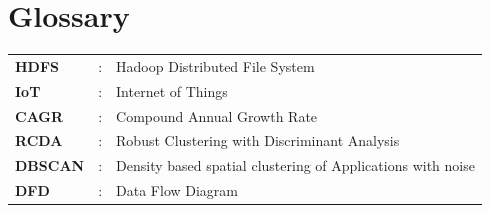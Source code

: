 \documentclass[12pt, a4paper]{report}
\begin{document}








\cleardoublepage
{}
{}
\tableofcontents
\cleardoublepage

{}
\listoffigures
\cleardoublepage

{}
\listoftables
\cleardoublepage

\chapter*{Glossary}
\begin{tabular}{lll}
\textbf{HDFS} & : & Hadoop Distributed File System \\
\textbf{IoT} & : & Internet of Things \\
\textbf{CAGR} & : & Compound Annual Growth Rate \\
\textbf{RCDA} & : & Robust Clustering with Discriminant Analysis \\
\textbf{DBSCAN} & : & Density based spatial clustering of Applications with noise \\
\textbf{DFD} & : & Data Flow Diagram \\
\end{tabular}
\cleardoublepage

\pagestyle{fancy} %






\cleardoublepage
{}
{}




\end{document}
